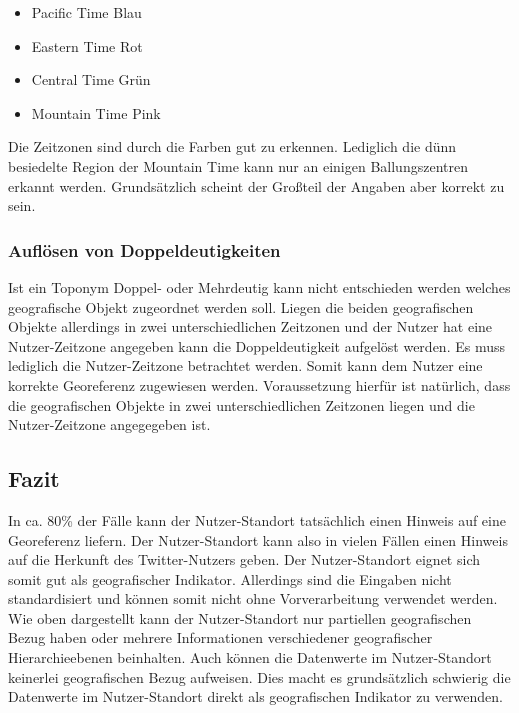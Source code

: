 				\begin{itemize}
				 	\item Pacific Time Blau
				 	\item Eastern Time	Rot
				 	\item Central Time Grün
				 	\item Mountain Time Pink 
				 \end{itemize} 

				 Die Zeitzonen sind durch die Farben gut zu erkennen. 
				 Lediglich die dünn besiedelte Region der Mountain Time kann nur an einigen Ballungszentren erkannt werden. 
				 Grundsätzlich scheint der Großteil der Angaben aber korrekt zu sein.

			\subsubsection{Auflösen von Doppeldeutigkeiten}

				Ist ein Toponym Doppel- oder Mehrdeutig kann nicht entschieden werden welches geografische Objekt zugeordnet werden soll.
				Liegen die beiden geografischen Objekte allerdings in zwei unterschiedlichen Zeitzonen und der Nutzer hat eine Nutzer-Zeitzone angegeben kann die Doppeldeutigkeit aufgelöst werden.
				Es muss lediglich die Nutzer-Zeitzone betrachtet werden.
				Somit kann dem Nutzer eine korrekte Georeferenz zugewiesen werden.
				Voraussetzung hierfür ist natürlich, dass die geografischen Objekte in zwei unterschiedlichen Zeitzonen liegen und die Nutzer-Zeitzone angegegeben ist.

		\subsection{Fazit} 

			In ca. 80\% der Fälle kann der Nutzer-Standort tatsächlich einen Hinweis auf eine Georeferenz liefern.
			Der Nutzer-Standort kann also in vielen Fällen einen Hinweis auf die Herkunft des Twitter-Nutzers geben.
			Der Nutzer-Standort eignet sich somit gut als geografischer Indikator. Allerdings sind die Eingaben nicht standardisiert und können somit nicht ohne Vorverarbeitung verwendet werden.
			Wie oben dargestellt kann der Nutzer-Standort nur partiellen geografischen Bezug haben oder mehrere Informationen verschiedener geografischer Hierarchieebenen beinhalten. 
			Auch können die Datenwerte im Nutzer-Standort keinerlei geografischen Bezug aufweisen.
			Dies macht es grundsätzlich schwierig die Datenwerte im Nutzer-Standort direkt als geografischen Indikator zu verwenden.
			
